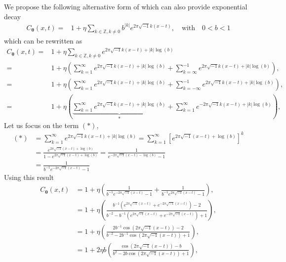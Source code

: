 \documentclass{iitthesis}          %
\newcommand{\bm}[1]{\boldsymbol{#1}}
\newcommand{\vtheta}{{\bm{\theta}}}
\def\abs#1{\ensuremath{\left \lvert #1 \right \rvert}}
\begin{document}
\label{sec:exp_decay_kernel}
We propose the following alternative form of which can also provide exponential decay
\begin{align*}
C_\vtheta(x, t) = & 1 + \eta \sum_{k \in \mathbb{Z}, k \neq 0 } b^{\abs{k}}  
e^{ 2 \pi\sqrt{-1} k (x-t)}, \quad \text{with} \quad 0 < b < 1
\end{align*}
which can be rewritten as
\begin{align*}
C_\vtheta(x, t) = & 1 + \eta \sum_{k \in \mathbb{Z}, k \neq 0 } 
e^{ 2 \pi\sqrt{-1} k (x-t) + \abs{k} \log(b)}
\\
=& 1 + \eta 
\left(
\sum_{k=1}^\infty e^{ 2 \pi\sqrt{-1} k (x-t) + \abs{k} \log(b)} 
+
\sum_{k=\infty}^{-1} e^{ 2 \pi\sqrt{-1} k (x-t) + \abs{k} \log(b)}
\right), 
\\
=& 1 + \eta 
\left(
\sum_{k=1}^\infty e^{ 2 \pi\sqrt{-1} k (x-t) + \abs{k} \log(b)} 
+
\sum_{k=-\infty}^{-1} e^{ 2 \pi\sqrt{-1} k (x-t) + \abs{k} \log(b)}
\right), 
\\
=& 1 + \eta 
\left(
\underbrace{
	\sum_{k=1}^\infty e^{ 2 \pi\sqrt{-1} k (x-t) + \abs{k} \log(b)} }_{*}
+
\sum_{k=1}^{\infty} e^{ -2 \pi\sqrt{-1} k (x-t) + \abs{k} \log(b)}
\right), 
\end{align*}
Let us focus on the term $(*)$,
\begin{align*}
(*) & = \sum_{k=1}^\infty e^{ 2 \pi\sqrt{-1} k (x-t) + \abs{k} \log(b)} =
\sum_{k=1}^\infty \left[e^{ 2 \pi\sqrt{-1} (x-t) +  \log(b)} \right]^k
\\
& = \frac{e^{ 2 \pi\sqrt{-1} (x-t) +  \log(b)}}{1- e^{ 2 \pi\sqrt{-1} (x-t) +  \log(b)}}
= \frac{1}{ e^{- 2 \pi\sqrt{-1} (x-t) -  \log(b)} -1 }
\\
& =\frac{1}{ b^{-1} e^{- 2 \pi\sqrt{-1} (x-t)} -1 }
\end{align*}
Using this result
\begin{align*}
C_\vtheta(x, t) &= 
1 + \eta 
\left(
\frac{1}{ b^{-1} e^{- 2 \pi\sqrt{-1} (x-t)} -1 }
+
\frac{1}{ b^{-1} e^{ 2 \pi\sqrt{-1} (x-t)} -1 }
\right),
\\
&= 
1 + \eta 
\left(
\frac{b^{-1} \left(e^{2 \pi\sqrt{-1} (x-t) }+ e^{ -2 \pi\sqrt{-1} (x-t)}\right) -2 }
{b^{-2} - b^{-1} \left(e^{ 2 \pi\sqrt{-1} (x-t)} + e^{ -2 \pi\sqrt{-1} (x-t)}\right) + 1 }
\right),
\\
&= 
1 + \eta 
\left(
\frac{2 b^{-1} \cos({2 \pi\sqrt{-1} (x-t) }) -2 }
{b^{-2} - 2 b^{-1} \cos({ 2 \pi\sqrt{-1} (x-t)})  + 1 }
\right),
\\
&= 
1 + 2 \eta b
\left(
\frac{ \cos({2 \pi\sqrt{-1} (x-t) }) - b }
{b^{2} - 2 b \cos({ 2 \pi\sqrt{-1} (x-t)})  + 1 }
\right),
\end{align*}
\end{document}
